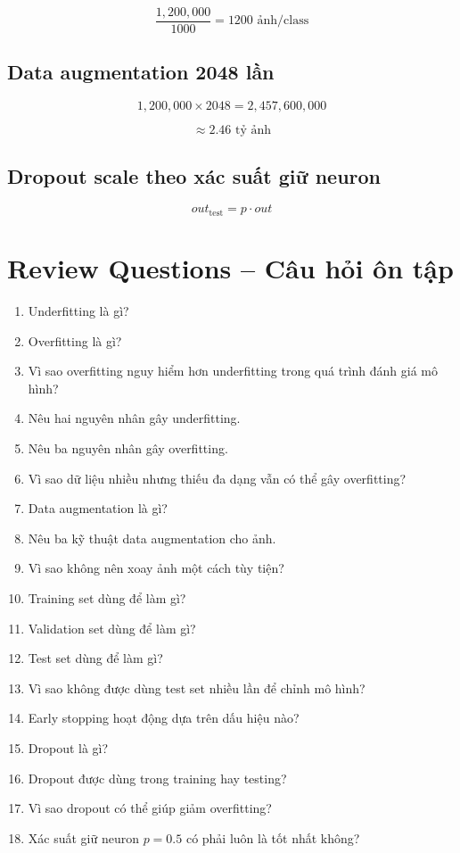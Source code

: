 \[
    \frac{1,200,000}{1000}=1200 \text{ ảnh/class}
\]

\subsection*{Data augmentation 2048 lần}

\[
    1,200,000 \times 2048
    =
    2,457,600,000
\]

\[
    \approx 2.46 \text{ tỷ ảnh}
\]

\subsection*{Dropout scale theo xác suất giữ neuron}

\[
    out_{\text{test}} = p \cdot out
\]

\section{Review Questions -- Câu hỏi ôn tập}

\begin{enumerate}
    \item Underfitting là gì?
    \item Overfitting là gì?
    \item Vì sao overfitting nguy hiểm hơn underfitting trong quá trình đánh giá mô hình?
    \item Nêu hai nguyên nhân gây underfitting.
    \item Nêu ba nguyên nhân gây overfitting.
    \item Vì sao dữ liệu nhiều nhưng thiếu đa dạng vẫn có thể gây overfitting?
    \item Data augmentation là gì?
    \item Nêu ba kỹ thuật data augmentation cho ảnh.
    \item Vì sao không nên xoay ảnh một cách tùy tiện?
    \item Training set dùng để làm gì?
    \item Validation set dùng để làm gì?
    \item Test set dùng để làm gì?
    \item Vì sao không được dùng test set nhiều lần để chỉnh mô hình?
    \item Early stopping hoạt động dựa trên dấu hiệu nào?
    \item Dropout là gì?
    \item Dropout được dùng trong training hay testing?
    \item Vì sao dropout có thể giúp giảm overfitting?
    \item Xác suất giữ neuron $p=0.5$ có phải luôn là tốt nhất không?
\end{enumerate}


